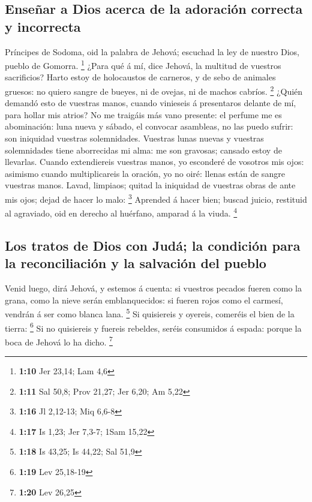 \hypertarget{enseuxf1ar-a-dios-acerca-de-la-adoraciuxf3n-correcta-y-incorrecta}{%
\subsection{Enseñar a Dios acerca de la adoración correcta y
incorrecta}\label{enseuxf1ar-a-dios-acerca-de-la-adoraciuxf3n-correcta-y-incorrecta}}

 Príncipes de Sodoma, oid la palabra de Jehová; escuchad
la ley de nuestro Dios, pueblo de Gomorra. \footnote{\textbf{1:10} Jer
  23,14; Lam 4,6}  ¿Para qué á mí, dice Jehová, la
multitud de vuestros sacrificios? Harto estoy de holocaustos de
carneros, y de sebo de animales gruesos: no quiero sangre de bueyes, ni
de ovejas, ni de machos cabríos. \footnote{\textbf{1:11} Sal 50,8; Prov
  21,27; Jer 6,20; Am 5,22}  ¿Quién demandó esto de
vuestras manos, cuando vinieseis á presentaros delante de mí, para
hollar mis atrios?  No me traigáis más vano presente: el
perfume me es abominación: luna nueva y sábado, el convocar asambleas,
no las puedo sufrir: son iniquidad vuestras solemnidades.
 Vuestras lunas nuevas y vuestras solemnidades tiene
aborrecidas mi alma: me son gravosas; cansado estoy de llevarlas.
 Cuando extendiereis vuestras manos, yo esconderé de
vosotros mis ojos: asimismo cuando multiplicareis la oración, yo no
oiré: llenas están de sangre vuestras manos.  Lavad,
limpiaos; quitad la iniquidad de vuestras obras de ante mis ojos; dejad
de hacer lo malo: \footnote{\textbf{1:16} Jl 2,12-13; Miq 6,6-8}
 Aprended á hacer bien; buscad juicio, restituid al
agraviado, oid en derecho al huérfano, amparad á la viuda. \footnote{\textbf{1:17}
  Is 1,23; Jer 7,3-7; 1Sam 15,22}

\hypertarget{los-tratos-de-dios-con-juduxe1-la-condiciuxf3n-para-la-reconciliaciuxf3n-y-la-salvaciuxf3n-del-pueblo}{%
\subsection{Los tratos de Dios con Judá; la condición para la
reconciliación y la salvación del
pueblo}\label{los-tratos-de-dios-con-juduxe1-la-condiciuxf3n-para-la-reconciliaciuxf3n-y-la-salvaciuxf3n-del-pueblo}}

 Venid luego, dirá Jehová, y estemos á cuenta: si
vuestros pecados fueren como la grana, como la nieve serán
emblanquecidos: si fueren rojos como el carmesí, vendrán á ser como
blanca lana. \footnote{\textbf{1:18} Is 43,25; Is 44,22; Sal 51,9}
 Si quisiereis y oyereis, comeréis el bien de la tierra:
\footnote{\textbf{1:19} Lev 25,18-19}  Si no quisiereis y
fuereis rebeldes, seréis consumidos á espada: porque la boca de Jehová
lo ha dicho. \footnote{\textbf{1:20} Lev 26,25}

